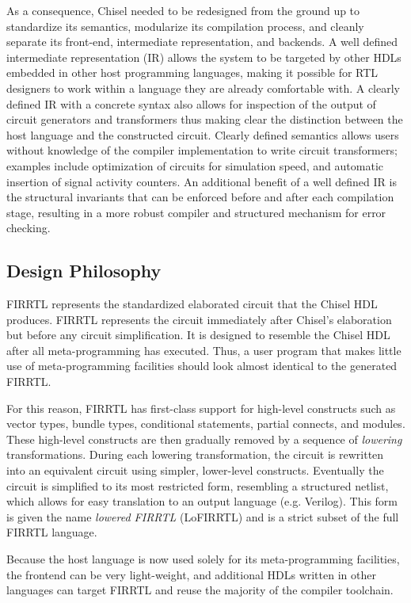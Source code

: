 \documentclass[12pt]{article}
\begin{document}
As a consequence, Chisel needed to be redesigned from the ground up to standardize its semantics, modularize its compilation process, and cleanly separate its front-end, intermediate representation, and backends. A well defined intermediate representation (IR) allows the system to be targeted by other HDLs embedded in other host programming languages, making it possible for RTL designers to work within a language they are already comfortable with. A clearly defined IR with a concrete syntax also allows for inspection of the output of circuit generators and transformers thus making clear the distinction between the host language and the constructed circuit. Clearly defined semantics allows users without knowledge of the compiler implementation to write circuit transformers; examples include optimization of circuits for simulation speed, and automatic insertion of signal activity counters. An additional benefit of a well defined IR is the structural invariants that can be enforced before and after each compilation stage, resulting in a more robust compiler and structured mechanism for error checking. 

\subsection{Design Philosophy}
FIRRTL represents the standardized elaborated circuit that the Chisel HDL produces. FIRRTL represents the circuit immediately after Chisel's elaboration but before any circuit simplification. It is designed to resemble the Chisel HDL after all meta-programming has executed. Thus, a user program that makes little use of meta-programming facilities should look almost identical to the generated FIRRTL.

For this reason, FIRRTL has first-class support for high-level constructs such as vector types, bundle types, conditional statements, partial connects, and modules. These high-level constructs are then gradually removed by a sequence of {\em lowering} transformations. During each lowering transformation, the circuit is rewritten into an equivalent circuit using simpler, lower-level constructs. Eventually the circuit is simplified to its most restricted form, resembling a structured netlist, which allows for easy translation to an output language (e.g. Verilog). This form is given the name {\em lowered FIRRTL} (LoFIRRTL) and is a strict subset of the full FIRRTL language.

Because the host language is now used solely for its meta-programming facilities, the frontend can be very light-weight, and additional HDLs written in other languages can target FIRRTL and reuse the majority of the compiler toolchain.
\end{document}
